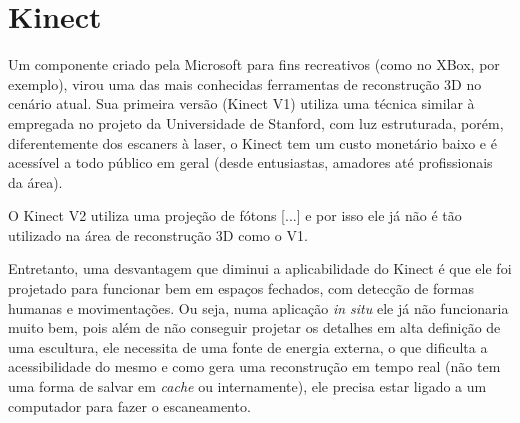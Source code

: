 \chapter{Kinect}\label{sec:kinect}
Um componente criado pela Microsoft para fins recreativos (como no XBox, por exemplo), virou uma das mais conhecidas ferramentas de reconstrução 3D no cenário atual. Sua primeira versão (Kinect V1) utiliza uma técnica similar à empregada no projeto da Universidade de Stanford, com luz estruturada, porém, diferentemente dos escaners à laser, o Kinect tem um custo monetário baixo e é acessível a todo público em geral (desde entusiastas, amadores até profissionais da área). 

O Kinect V2 utiliza uma projeção de fótons [...] e por isso ele já não é tão utilizado na área de reconstrução 3D como o V1.

Entretanto, uma desvantagem que diminui a aplicabilidade do Kinect é que ele foi projetado para funcionar bem em espaços fechados, com detecção de formas humanas e movimentações. Ou seja, numa aplicação {\it in situ} ele já não funcionaria muito bem, pois além de não conseguir projetar os detalhes em alta definição de uma escultura, ele necessita de uma fonte de energia externa, o que dificulta a acessibilidade do mesmo e como gera uma reconstrução em tempo real (não tem uma forma de salvar em {\it cache} ou internamente), ele precisa estar ligado a um computador para fazer o escaneamento.